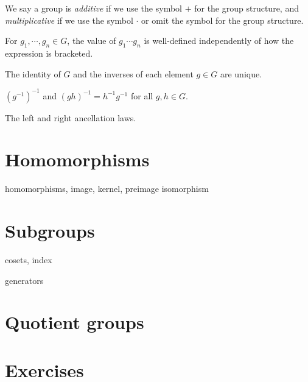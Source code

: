 \documentclass{../../large}
\begin{document}
\begin{prb}
We say a group is \emph{additive} if we use the symbol $+$ for the group structure, and \emph{multiplicative} if we use the symbol $\cdot$ or omit the symbol for the group structure.
\begin{parts}
\item For $g_1,\cdots,g_n\in G$, the value of $g_1\cdots g_n$ is well-defined independently of how the expression is bracketed.
\item The identity of $G$ and the inverses of each element $g\in G$ are unique.
\item $(g^{-1})^{-1}$ and $(gh)^{-1}=h^{-1}g^{-1}$ for all $g,h\in G$.
\item The left and right ancellation laws.
\end{parts}
\end{prb}

\begin{prb}
\end{prb}

\section{Homomorphisms}
homomorphisms, image, kernel, preimage
isomorphism

\section{Subgroups}

\begin{prb}[Subgroups]
\end{prb}
\begin{prb}
cosets, index
\end{prb}
\begin{prb}
\end{prb}

generators


\section{Quotient groups}
\begin{prb}
\end{prb}
\begin{prb}
\end{prb}



\section*{Exercises}
\begin{prb}
\end{prb}
\end{document}
